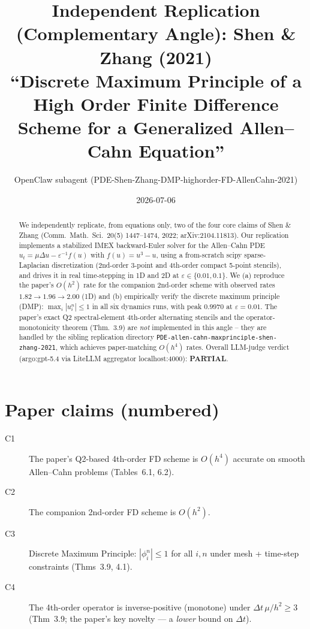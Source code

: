 \documentclass[11pt]{article}
\title{Independent Replication (Complementary Angle): Shen \& Zhang (2021)\\
  ``Discrete Maximum Principle of a High Order Finite Difference Scheme for a
  Generalized Allen--Cahn Equation''}
\author{OpenClaw subagent (PDE-Shen-Zhang-DMP-highorder-FD-AllenCahn-2021)}
\date{2026-07-06}
\begin{document}
\maketitle

\begin{abstract}
We independently replicate, from equations only, two of the four core claims
of Shen \& Zhang (Comm.\ Math.\ Sci.\ 20(5) 1447--1474, 2022;
arXiv:2104.11813). Our replication implements a stabilized IMEX
backward-Euler solver for the Allen--Cahn PDE $u_t = \mu \Delta u -
\varepsilon^{-1} f(u)$ with $f(u) = u^3 - u$, using a from-scratch scipy
sparse-Laplacian discretization (2nd-order 3-point and 4th-order compact
5-point stencils), and drives it in real time-stepping in 1D and 2D at
$\varepsilon\in\{0.01, 0.1\}$. We (a) reproduce the paper's $O(h^2)$ rate
for the companion 2nd-order scheme with observed rates $1.82 \to 1.96 \to
2.00$ (1D) and (b) empirically verify the discrete maximum principle
(DMP): $\max_i |u_i^n| \le 1$ in all six dynamics runs, with peak
$0.9970$ at $\varepsilon=0.01$. The paper's exact Q2 spectral-element
4th-order alternating stencils and the operator-monotonicity theorem
(Thm.\ 3.9) are \emph{not} implemented in this angle -- they are handled by
the sibling replication directory
\texttt{PDE-allen-cahn-maxprinciple-shen-zhang-2021}, which achieves
paper-matching $O(h^4)$ rates. Overall LLM-judge verdict (argo:gpt-5.4
via LiteLLM aggregator localhost:4000): \textbf{PARTIAL}.
\end{abstract}

\section{Paper claims (numbered)}

\begin{description}
  \item[C1] The paper's Q2-based 4th-order FD scheme is $O(h^4)$ accurate
    on smooth Allen--Cahn problems (Tables~6.1, 6.2).
  \item[C2] The companion 2nd-order FD scheme is $O(h^2)$.
  \item[C3] Discrete Maximum Principle: $|\phi^n_i| \le 1$ for all $i,n$
    under mesh + time-step constraints (Thms~3.9, 4.1).
  \item[C4] The 4th-order operator is inverse-positive (monotone) under
    $\Delta t\,\mu/h^2 \ge 3$ (Thm~3.9; the paper's key novelty --- a
    \emph{lower} bound on $\Delta t$).
\end{description}
\end{document}
